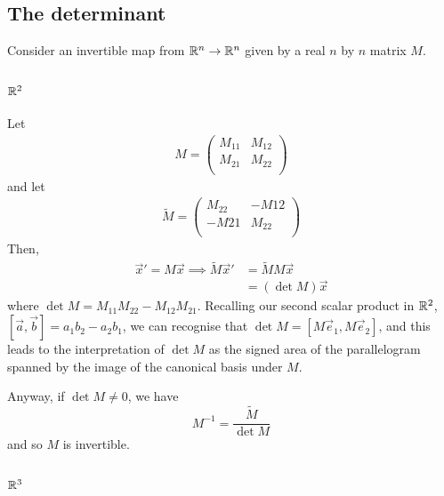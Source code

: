 \documentclass{../../template/note}
\begin{document}
    \subsection{The determinant}
    
    Consider an invertible map from \(\mathbb R^n \to \mathbb R^n\) given by a real \(n\) by \(n\) matrix \(M\).

    \subsubsection{\(\mathbb R^2\)}

    Let
    \begin{align*}
        M = \begin{pmatrix}
         M_{11} & M_{12} \\
         M_{21} & M_{22} \\
        \end{pmatrix}
    \end{align*}
    and let
    \begin{align*}
        \tilde{M} = \begin{pmatrix}
         M_{22} & -M{12} \\
         -M{21} & M_{22} \\
        \end{pmatrix}
    \end{align*}
    Then,
    \begin{align*}
        \vec x' = M\vec x \implies \tilde M \vec x' &= \tilde MM \vec x \\
        &= (\det M) \vec x
    \end{align*}
    where \(\det M = M_{11}M_{22} - M_{12}M_{21}\). Recalling our second scalar product in \(\mathbb R^2\), \([\vec a, \vec b] = a_1b_2 - a_2b_1\), we can recognise that \(\det M = [M\vec e_1, M\vec e_2]\), and this leads to the interpretation of \(\det M\) as the signed area of the parallelogram spanned by the image of the canonical basis under \(M\).
    
    Anyway, if \(\det M \neq 0\), we have
    \[
        M^{-1} = \frac{\tilde M}{\det M}
    \]
    and so \(M\) is invertible.

    \subsubsection{\(\mathbb R^3\)}
\end{document}
